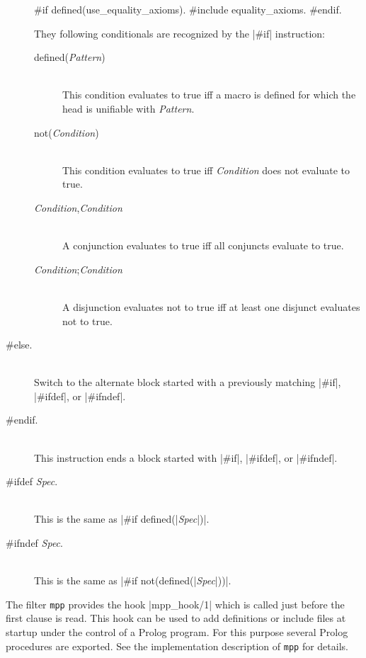 \begin{description}
\begin{BoxedSample}
  \#if defined(use\_equality\_axioms).
  \#include equality\_axioms.
  \#endif.
\end{BoxedSample}

  They following conditionals are recognized by the |#if| instruction:

  \begin{description}
  \item [defined({\em Pattern}\/)]\ \\
    This condition evaluates to true iff a macro is defined for which the head
    is unifiable with {\em Pattern}.

  \item [not({\em Condition})]\ \\
    This condition evaluates to true iff {\em Condition} does not evaluate to
    true.
  \item [{\em Condition},{\em Condition}]\ \\
    A conjunction evaluates to true iff all conjuncts evaluate to true.

  \item [{\em Condition};{\em Condition}]\ \\
    A disjunction evaluates not to true iff at least one disjunct evaluates
    not to true.
  \end{description}

\item [\#else.]\ \\
  Switch to the alternate block started with a previously matching |#if|,
  |#ifdef|, or |#ifndef|.

\item [\#endif.]\ \\
  This instruction ends a block started with |#if|, |#ifdef|, or |#ifndef|.

\item [\#ifdef {\em Spec}.]\ \\
  This is the same as |#if defined(|{\em Spec}\/|)|.
  
\item [\#ifndef {\em Spec}.]\ \\
  This is the same as |#if not(defined(|{\em Spec}\/|))|.
\end{description}


The filter {\tt mpp} provides the hook |mpp_hook/1| which is called just
before the first clause is read. This hook can be used to add definitions or
include files at startup under the control of a Prolog program. For this
purpose several Prolog procedures are exported. See the implementation
description of {\tt mpp} for details.



